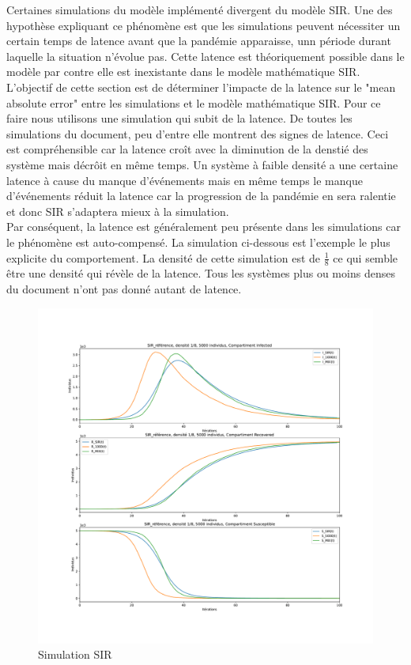 Certaines simulations du modèle implémenté divergent du modèle SIR. Une des hypothèse expliquant ce phénomène est que les simulations peuvent nécessiter un certain temps de latence avant que la pandémie apparaisse, unn période durant laquelle la situation n'évolue pas. Cette latence est théoriquement possible dans le modèle par contre elle est inexistante dans le modèle mathématique SIR.\\

L'objectif de cette section est de déterminer l'impacte de la latence sur le "mean absolute error" entre les simulations et le modèle mathématique SIR. Pour ce faire nous utilisons une simulation qui subit de la latence. De toutes les simulations du document, peu d'entre elle montrent des signes de latence. Ceci est compréhensible car la latence croît avec la diminution de la denstié des système mais décrôit en même temps. Un système à faible densité a une certaine latence à cause du manque d'événements mais en même temps le manque d'événements réduit la latence car la progression de la pandémie en sera ralentie et donc SIR s'adaptera mieux à la simulation.\\

Par conséquent, la latence est généralement peu présente dans les simulations car le phénomène est auto-compensé. La simulation ci-dessous est l'exemple le plus explicite du comportement. La densité de cette simulation est de $\frac{1}{8}$ ce qui semble être une densité qui révèle de la latence. Tous les systèmes plus ou moins denses du document n'ont pas donné autant de latence.

\newpage

\begin{figure}[h]
	\centering
	\captionsetup{justification=centering}
	\includegraphics[width=.6\textwidth]{Images/SIR_ref_8_5.pdf}
	\caption{Simulation SIR}
\end{figure}


